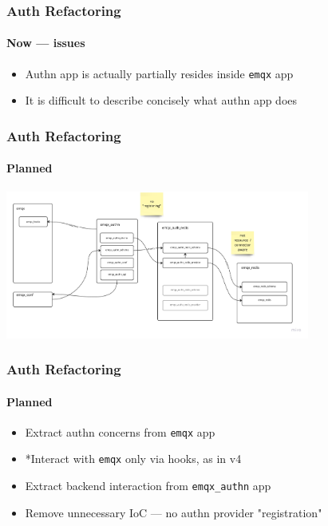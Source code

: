 \documentclass{beamer}
\begin{document}
\begin{frame}
    \frametitle{Auth Refactoring}
    \framesubtitle{Now — issues}

    \begin{center}
        \begin{itemize}
            \item Authn app is actually partially resides inside \lstinline{emqx} app
            \item It is difficult to describe concisely what authn app does
        \end{itemize}
    \end{center}
\end{frame}

\begin{frame}
    \frametitle{Auth Refactoring}
    \framesubtitle{Planned}

    \begin{center}
            \includegraphics[width=10cm, keepaspectratio]{images/authn-planned.jpeg}
    \end{center}
\end{frame}

\begin{frame}
    \frametitle{Auth Refactoring}
    \framesubtitle{Planned}

    \begin{center}
        \begin{itemize}
            \item Extract authn concerns from \lstinline{emqx} app
            \item *Interact with \lstinline{emqx} only via hooks, as in v4
            \item Extract backend interaction from \lstinline{emqx_authn} app
            \item Remove unnecessary IoC — no authn provider "registration"
        \end{itemize}
    \end{center}
\end{frame}
\end{document}
